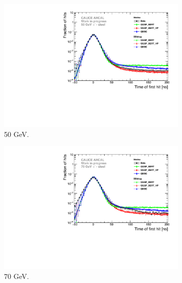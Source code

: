\begin{figure}[htbp!]
\begin{subfigure}[t]{0.5\textwidth}
		\includegraphics[width=1\textwidth]{chap5/fig_AHCAL_timing/Pions/Comparison_SimData_Pion50GeV_LateClusters.pdf}
		\caption{50 GeV.} \label{fig:dNdt_SimData_50GeV}
	\end{subfigure}
	\hfill
	\begin{subfigure}[t]{0.5\textwidth}
		\centering
		\includegraphics[width=1\textwidth]{chap5/fig_AHCAL_timing/Pions/Comparison_SimData_Pion70GeV_LateClusters.pdf}
		\caption{70 GeV.} \label{fig:dNdt_SimData_70GeV}
	\end{subfigure}
	\hfill
	\begin{subfigure}[t]{0.5\textwidth}
		\centering

\end{subfigure}
\end{figure}
